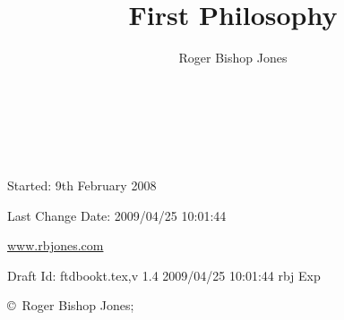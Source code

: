 \documentclass[10pt,titlepage]{article}
\author{Roger Bishop Jones}
\title{First Philosophy}
\date{\ }
\begin{document}
\begin{titlepage}
\maketitle

\ 
\\

\vfill

\begin{centering}

{\footnotesize

Started: 9th February 2008

Last Change $ $Date: 2009/04/25 10:01:44 $ $

\href{http://www.rbjones.com/}{www.rbjones.com}

Draft $ $Id: ftdbookt.tex,v 1.4 2009/04/25 10:01:44 rbj Exp $ $

\copyright\ Roger Bishop Jones;

}%

\end{centering}

\thispagestyle{empty}
\end{titlepage}

{\parskip=0pt\tableofcontents}
\end{document}
